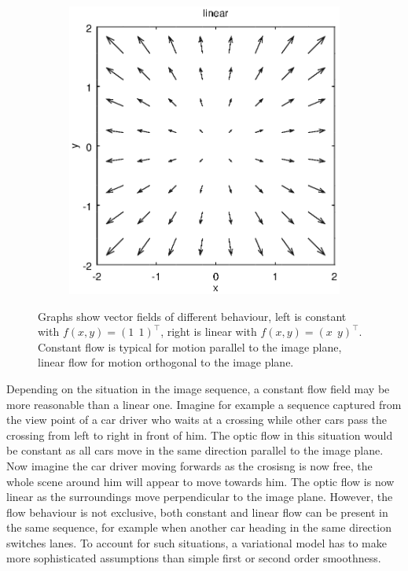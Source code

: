 \documentclass[journal]{vgtc}
\newcommand{\T}{^\top}
\begin{document}
\begin{figure}[htb]
\begin{subfigure}{0.49\linewidth}
\includegraphics[width=\linewidth]{images/linearflow.eps}
\end{subfigure}
\caption{
Graphs show vector fields of different behaviour, left is constant with $f(x,y) = (1\;\, 1)\T$, right is linear with $f(x,y) = (x \;\, y)\T$.
Constant flow is typical for motion parallel to the image plane, linear flow for motion orthogonal to the image plane. 
}
\label{fig:flowfields}
\end{figure}

Depending on the situation in the image sequence, a constant flow field may be more reasonable than a linear one.
Imagine for example a sequence captured from the view point of a car driver who waits at a crossing while other cars pass the crossing from left to right in front of him.
The optic flow in this situation would be constant as all cars move in the same direction parallel to the image plane.
Now imagine the car driver moving forwards as the crosisng is now free, the whole scene around him will appear to move towards him.
The optic flow is now linear as the surroundings move perpendicular to the image plane.
However, the flow behaviour is not exclusive, both constant and linear flow can be present in the same sequence, for example when another car heading in the same direction switches lanes.
To account for such situations, a variational model has to make more sophisticated assumptions than simple first or second order smoothness.
\end{document}
